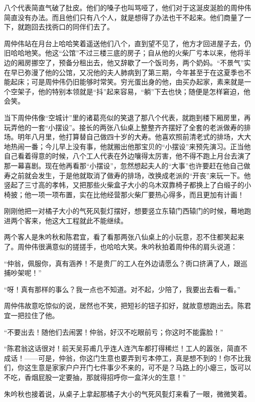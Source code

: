 \par 八个代表简直气破了肚皮。他们的嗓子也叫骂哑了，他们对于这涎皮涎脸的周仲伟简直没有办法。而且他们只有八个人，就是想得了办法也干不起来。他们商量了一下，就跑回去找衖口的同伴们去了。
\par 周仲伟站在月台上哈哈笑着遥送他们八个，直到望不见了，他方才回进屋子去，仍旧哈哈地笑。他这“公馆”不过三楼三底的房子；自从他的火柴厂亏本以来，他将半边的厢房挪空了，预备分租出去，他又辞歇了一个饭司务，两个奶妈。“不景气”实在早已弥漫了他的公馆，又况他的夫人肺病到了第三期，今年甚至于在这夏季也不能起床；可是周仲伟仍旧能够时常笑。穷光蛋出身的他，由买办起家，素来就是一个空架子，他的特别本领就是“抖”起来容易，“躺”下去也快；随便是怎样窘迫，他会笑。
\par 当下周仲伟像“空城计”里的诸葛亮似的笑退了那八个代表，就跑到楼下厢房里，再玩弄他的一套“小摆设”。接长的两张八仙桌上整整齐齐摆好了全套的老派做寿的排场。明年八月里，他打算替自己做四十岁的大寿。他喜欢照前清老式的排场，大大地热闹一番；今儿早上没有事，他就搬出他那宝贝的“小摆设”来预先演习。正当他自己看着得意的时候，八个工人代表在外边嚷得太厉害，他不得不跑上月台去演了那一幕喜剧。现在他再看那“小摆设”，忽然想起夫人的“大事”也许要赶在他自己做寿之前就会发生，于是他就取消了做寿的排场，改换成老派的“开丧”来玩一下。他竖起了三寸高的孝帏，又把那些火柴盒子大小的乌木双靠椅子都换上了白缎子的小椅披；他一项一项布置，实在比他经营那火柴厂要热心得多，而且更加有计画！
\par 刚刚他把一对橘子大小的气死风甏灯摆好，想要竖立东辕门西辕门的时候，蓦地跑进两个客来，他这大工程就此不能继续。
\par 两个客人是朱吟秋和陈君宜，看了看那两张八仙桌上的小玩意，忍不住都笑起来了。周仲伟很满意似的搓搓手，也哈哈大笑。朱吟秋拍着周仲伟的肩头说道：
\par “仲翁，佩服你，真有涵养！不是贵厂的工人在外边请愿么？衖口挤满了人，跟巡捕吵架呢！”
\par “呀！真有那样的事么？我一点也不知道。对不起，少陪了，我要出去看一看。”
\par 周仲伟故意吃惊似的说，居然也不笑，把短衫的钮子扣好，就故意想跑出去。陈君宜一把拉住了他。
\par “不要出去！随他们去闹罢！仲翁，好汉不吃眼前亏；你这时不能露脸！”
\par “陈君翁这话很对！前天吴荪甫几乎连人连汽车都打得稀烂！工人的嚣张，简直不成话！——可是，仲翁，你这门生意也要弄到亏本停工，真是想不到的！你不比我们，你这生意是家家户户开门七件事少不来的，可不是？马路上的小瘪三，饭可以不吃，香烟屁股一定要抽，那就得招呼你一盒洋火的生意！”
\par 朱吟秋也接着说，从桌子上拿起那橘子大小的气死风甏灯来看了一眼，微微笑着。
